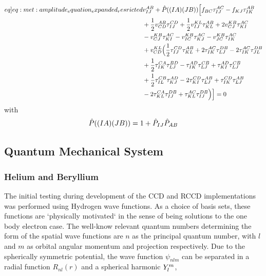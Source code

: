 \begin{align}
    \begin{split}\label[eq]{eq:met:amplitude_equation_expanded_resricted}
        &\elmshort{AB}{IJ} + \permoperator{(IA)(JB)} \Big[ f_{BC}\amplituderestrict{AC}{IJ} -f_{KJ}\amplituderestrict{AB}{IK} \\
        &+ \frac{1}{2}\elmshort{AB}{CD}\amplituderestrict{CD}{IJ} + \frac{1}{2}\elmshort{KL}{IJ}\amplituderestrict{AB}{KL} + 2 \elmshort{KB}{CJ}\amplituderestrict{AC}{KI} \\
        &-\elmshort{KB}{CJ}\amplituderestrict{AC}{KI} - \elmshort{KB}{IC}\amplituderestrict{AC}{KJ} - \elmshort{KB}{JC}\amplituderestrict{AC}{IK} \\
        &+\elmshort{KL}{CD}\Big( \frac{1}{2}\amplituderestrict{CD}{IJ}\amplituderestrict{AB}{KL} + 2\amplituderestrict{AC}{IK}\amplituderestrict{DB}{LJ}-2\amplituderestrict{AC}{IK}\amplituderestrict{DB}{JL} \\
        &+\frac{1}{2}\amplituderestrict{CA}{IK}\amplituderestrict{BD}{LJ}-\amplituderestrict{AD}{IK}\amplituderestrict{CB}{LJ}+\amplituderestrict{AD}{KI}\amplituderestrict{CB}{LJ} \\
        &+\frac{1}{2}\amplituderestrict{CB}{IL}\amplituderestrict{AD}{KJ} -2\amplituderestrict{CD}{KI}\amplituderestrict{AB}{LJ}+ \amplituderestrict{CD}{IK}\amplituderestrict{AB}{LJ}\\
        &-2\amplituderestrict{CA}{KL}\amplituderestrict{DB}{IJ}+\amplituderestrict{AC}{KL}\amplituderestrict{DB}{IJ}\Big)
        \Big] = 0
    \end{split}
\end{align}
with
\begin{align*}
    \hat{P}((IA)(JB)) = 1 + \hat{P}_{IJ}\hat{P}_{AB}
\end{align*}

\subsection{Quantum Mechanical System}

\subsubsection{Helium and Beryllium}
The initial testing during development of the CCD and RCCD implementations was performed using Hydrogen wave functions. As a choice of basis sets, these functions are `physically motivated` in the sense of being solutions to the one body electron case. The well-know relevant quantum numbers determining the form of the spatial wave functions are $n$ as the principal quantum number, with $l$ and $m$ as orbital angular momentum and projection respectively. Due to the spherically symmetric potential, the wave function $\psi_{nlm}$ can be separated in a radial function $R_{nl}(r)$ and a spherical harmonic $Y^{m}_{l}$,  

